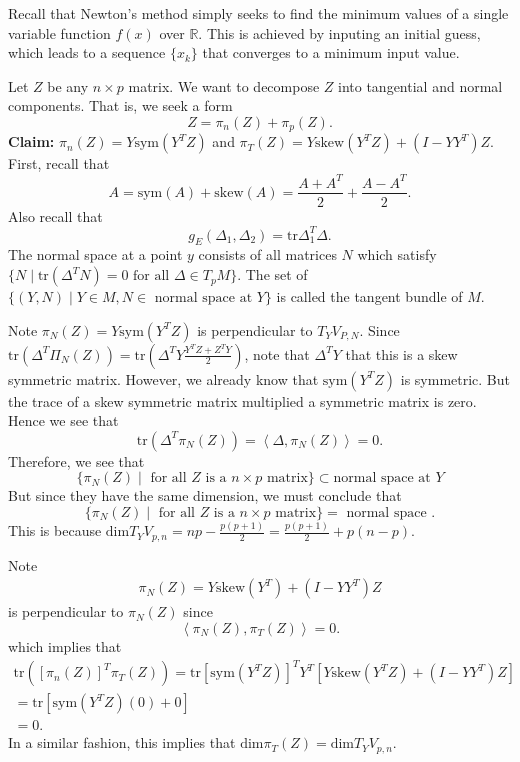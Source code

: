 \documentclass[12pt,letterpaper,boxed]{maths_v5}
\newcommand{\rr}{\mathbb{R}}
\theoremstyle{definition}
\begin{document}
Recall that Newton's method simply seeks to find the minimum values of a single 
variable function $f(x)$ over $\rr$. This is achieved by inputing an initial guess,
which leads to a sequence $\{x_k\}$  that converges to a minimum input value. 

Let $Z$ be any $n\times p $ matrix. We want to decompose $Z$ into tangential 
and normal components. 
That is, we seek a form 
\[
    Z = \pi_n(Z) + \pi_p(Z).    
\]
\textbf{Claim:}  $\pi_n(Z) =Y\text{sym}(Y^TZ)$ and 
$\pi_T(Z)  = Y\text{skew}(Y^TZ) + (I-YY^T)Z$. 
First,  recall that 
\[
    A = \text{sym}(A) + \text{skew}(A) = \frac{A + A^T}{2} + \frac{A - A^T}{2}. 
\]
Also recall that 
\[
    g_E(\Delta_1, \Delta_2) = \text{tr}\Delta_1^T\Delta.
\]
The normal space at a point $y$ consists of all matrices $N$ 
which satisfy $\{N \mid \text{tr}(\Delta^TN) = 0 \text{ for all } \Delta \in T_pM\}$.
The set of $\{ (Y, N) \mid Y \in M, N \in \text{ normal space at } Y \}$
is called the tangent bundle of $M$. 

Note $\pi_N(Z) = Y\text{sym}(Y^TZ)$ is perpendicular to $T_YV_{P, N}$.
Since $\text{tr}(\Delta^T\Pi_N(Z)) = \text{tr}(\Delta^TY\frac{Y^TZ + Z^TY}{2})$, 
note that $\Delta^TY$ that this is a skew symmetric matrix. However, we already 
know that $\text{sym}(Y^TZ)$ is symmetric. But the trace of a skew symmetric matrix multiplied a 
symmetric matrix is zero. Hence we see that 
\[
    \text{tr}(\Delta^T\pi_N(Z)) = \left< \Delta, \pi_N(Z) \right>  = 0. 
\]
Therefore, we see that 
\[
    \{\pi_N(Z) \mid \text{ for all } Z \text{ is a } n\times p \text{ matrix}\} \subset \text{normal space at } Y
\]
But since they have the same dimension, we must conclude that 
\[
    \{\pi_N(Z) \mid \text{ for all } Z \text{ is a } n\times p \text{ matrix}\} = \text{ normal space }.
\]
This is because $\text{dim} T_Y V_{p,n} = np - \frac{p(p+1)}{2} = \frac{p(p+1)}{2} + p(n-p)$.

Note 
\begin{align*}
    \pi_N(Z) = Y\text{skew}(Y^T) + (I - YY^T)Z
\end{align*}
is perpendicular to $\pi_N(Z)$ since 
\[
    \left< \pi_N(Z), \pi_T(Z) \right> = 0.
\]
which implies that 
\begin{align*}
    \text{tr}([\pi_n(Z)]^T\pi_T(Z)) = \text{tr}[\text{sym}(Y^TZ)]^TY^T[Y\text{skew}(Y^TZ) + (I-YY^T)Z]\\
    = \text{tr}[\text{sym}(Y^TZ)(0) + 0]\\
    = 0.
\end{align*}
In a similar fashion, this  implies  that $\text{dim}\pi_T(Z) = \text{dim}T_YV_{p,n}$.
\end{document}
